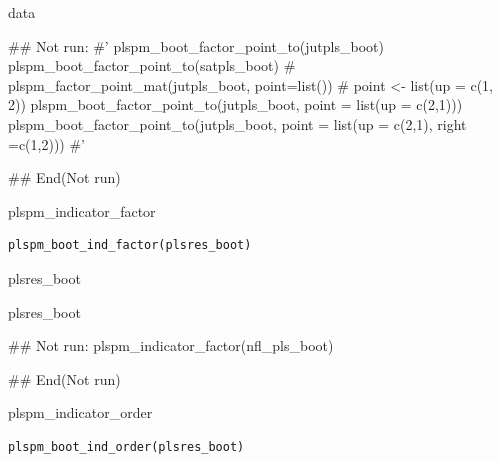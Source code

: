 \documentclass[a4paper]{book}
\begin{document}
%
\begin{Value}
data
\end{Value}
%
\begin{Examples}
\begin{ExampleCode}

## Not run: 
#'
plspm_boot_factor_point_to(jutpls_boot)
plspm_boot_factor_point_to(satpls_boot)
# plspm_factor_point_mat(jutpls_boot, point=list())
# point <- list(up = c(1, 2))
plspm_boot_factor_point_to(jutpls_boot, point = list(up = c(2,1)))
plspm_boot_factor_point_to(jutpls_boot, point = list(up = c(2,1), right =c(1,2)))
#'

## End(Not run)



\end{ExampleCode}
\end{Examples}
%
\begin{Description}
plspm\_indicator\_factor
\end{Description}
%
\begin{Usage}
\begin{verbatim}
plspm_boot_ind_factor(plsres_boot)
\end{verbatim}
\end{Usage}
%
\begin{Arguments}
\begin{ldescription}
\item[\code{plsres\_boot}] plsres\_boot
\end{ldescription}
\end{Arguments}
%
\begin{Value}
plsres\_boot
\end{Value}
%
\begin{Examples}
\begin{ExampleCode}
## Not run: 
plspm_indicator_factor(nfl_pls_boot)

## End(Not run)
\end{ExampleCode}
\end{Examples}
%
\begin{Description}
plspm\_indicator\_order
\end{Description}
%
\begin{Usage}
\begin{verbatim}
plspm_boot_ind_order(plsres_boot)
\end{verbatim}
\end{Usage}
\end{document}
